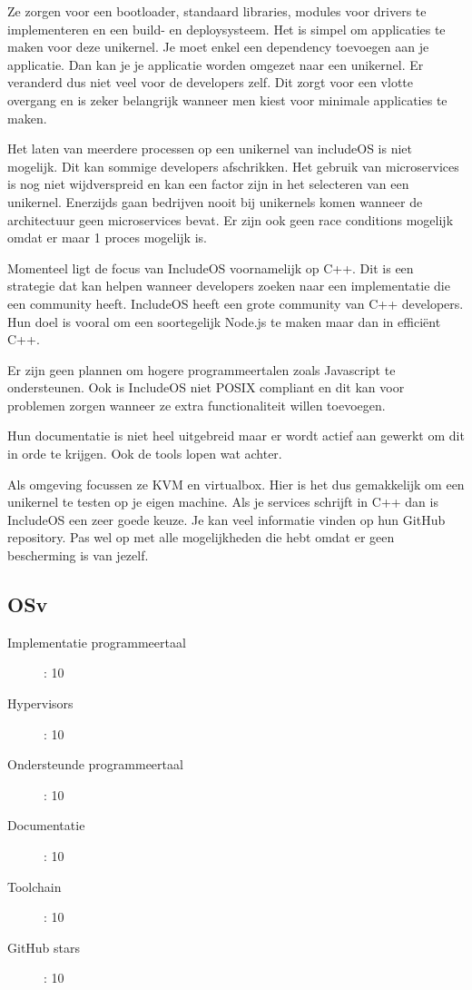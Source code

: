 \documentclass[pdftex,a4paper,12pt,twoside]{report}
\begin{document}
Ze zorgen voor een bootloader, standaard libraries, modules voor drivers te implementeren en een build- en deploysysteem. Het is simpel om applicaties te maken voor deze unikernel. Je moet enkel een dependency toevoegen aan je applicatie. Dan kan je je applicatie worden omgezet naar een unikernel. Er veranderd dus niet veel voor de developers zelf. Dit zorgt voor een vlotte overgang en is zeker belangrijk wanneer men kiest voor minimale applicaties te maken.

Het laten van meerdere processen op een unikernel van includeOS is niet mogelijk. Dit kan sommige developers afschrikken. Het gebruik van microservices is nog niet wijdverspreid en kan een factor zijn in het selecteren van een unikernel. Enerzijds gaan bedrijven nooit bij unikernels komen wanneer de architectuur geen microservices bevat. Er zijn ook geen race conditions mogelijk omdat er maar 1 proces mogelijk is.

Momenteel ligt de focus van IncludeOS voornamelijk op C++. Dit is een strategie dat kan helpen wanneer developers zoeken naar een implementatie die een community heeft. IncludeOS heeft een grote community van C++ developers. Hun doel is vooral om een soortegelijk Node.js te maken maar dan in efficiënt C++.

Er zijn geen plannen om hogere programmeertalen zoals Javascript te ondersteunen. Ook is IncludeOS niet POSIX compliant en dit kan voor problemen zorgen wanneer ze extra functionaliteit willen toevoegen.

Hun documentatie is niet heel uitgebreid maar er wordt actief aan gewerkt om dit in orde te krijgen. Ook de tools lopen wat achter.

Als omgeving focussen ze KVM en virtualbox. Hier is het dus gemakkelijk om een unikernel te testen op je eigen machine. Als je services schrijft in C++ dan is IncludeOS een zeer goede keuze. Je kan veel informatie vinden op hun GitHub repository. Pas wel op met alle mogelijkheden die hebt omdat er geen bescherming is van jezelf.

\subsection{OSv}

\begin{description}
  \item [Implementatie programmeertaal]: 10
  \item [Hypervisors]: 10
  \item [Ondersteunde programmeertaal]: 10
  \item [Documentatie]: 10
  \item [Toolchain]: 10
  \item [GitHub stars]: 10
\end{description}
\end{document}
